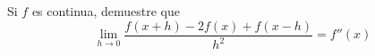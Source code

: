 \item Si $f$ es continua, demuestre que
    $$\lim_{h \to 0} \frac{f(x+h) - 2f(x) + f(x-h)}{h^2} = f''(x)$$
